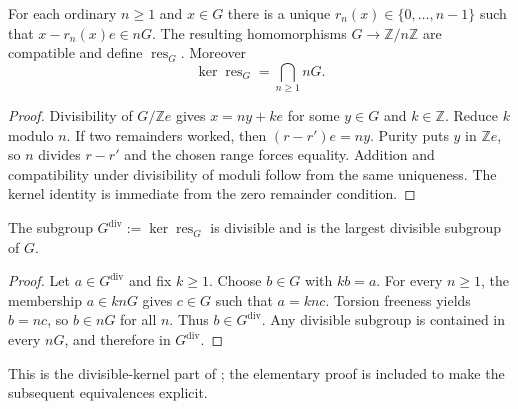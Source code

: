 \documentclass[11pt]{article}
\theoremstyle{definition}
\theoremstyle{remark}
\newcommand{\Z}{\mathbb{Z}}
\newcommand{\res}{\operatorname{res}}
\newcommand{\dv}{\mathrm{div}}
\begin{document}
\begin{lemma}[Residues]\label{isg:cf:lem:residues}
For each ordinary $n\ge1$ and $x\in G$ there is a unique
$r_n(x)\in\{0,\ldots,n-1\}$ such that
$x-r_n(x)e\in nG$. The resulting homomorphisms
$G\to\Z/n\Z$ are compatible and define $\res_G$.
Moreover
\[
 \ker\res_G=\bigcap_{n\ge1}nG.
\]
\end{lemma}
\begin{proof}
Divisibility of $G/\Z e$ gives $x=ny+ke$ for some $y\in G$ and
$k\in\Z$. Reduce $k$ modulo $n$. If two remainders worked, then
$(r-r')e=ny$. Purity puts $y$ in $\Z e$, so $n$ divides $r-r'$ and
the chosen range forces equality. Addition and compatibility under
divisibility of moduli follow from the same uniqueness. The kernel
identity is immediate from the zero remainder condition.
\end{proof}

\begin{lemma}\label{isg:cf:lem:divkernel}
The subgroup $G^{\dv}:=\ker\res_G$ is divisible and is the largest
divisible subgroup of $G$.
\end{lemma}
\begin{proof}
Let $a\in G^{\dv}$ and fix $k\ge1$. Choose $b\in G$ with $kb=a$.
For every $n\ge1$, the membership $a\in knG$ gives $c\in G$ such that
$a=knc$. Torsion freeness yields $b=nc$, so $b\in nG$ for all $n$.
Thus $b\in G^{\dv}$. Any divisible subgroup is contained in every $nG$,
and therefore in $G^{\dv}$.
\end{proof}

This is the divisible-kernel part of
\cite[Proposition~4.1 and Remark~4.2]{Jerabek}; the elementary proof is
included to make the subsequent equivalences explicit.
\end{document}
